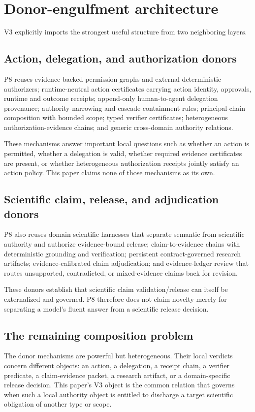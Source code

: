 \section{Donor-engulfment architecture}

V3 explicitly imports the strongest useful structure from two neighboring layers.

\subsection{Action, delegation, and authorization donors}

P8 reuses evidence-backed permission graphs and external deterministic authorizers; runtime-neutral action certificates carrying action identity, approvals, runtime and outcome receipts; append-only human-to-agent delegation provenance; authority-narrowing and cascade-containment rules; principal-chain composition with bounded scope; typed verifier certificates; heterogeneous authorization-evidence chains; and generic cross-domain authority relations.

These mechanisms answer important local questions such as whether an action is permitted, whether a delegation is valid, whether required evidence certificates are present, or whether heterogeneous authorization receipts jointly satisfy an action policy. This paper claims none of those mechanisms as its own.

\subsection{Scientific claim, release, and adjudication donors}

P8 also reuses domain scientific harnesses that separate semantic from scientific authority and authorize evidence-bound release; claim-to-evidence chains with deterministic grounding and verification; persistent contract-governed research artifacts; evidence-calibrated claim adjudication; and evidence-ledger review that routes unsupported, contradicted, or mixed-evidence claims back for revision.

These donors establish that scientific claim validation/release can itself be externalized and governed. P8 therefore does not claim novelty merely for separating a model's fluent answer from a scientific release decision.

\subsection{The remaining composition problem}

The donor mechanisms are powerful but heterogeneous. Their local verdicts concern different objects: an action, a delegation, a receipt chain, a verifier predicate, a claim-evidence packet, a research artifact, or a domain-specific release decision. This paper's V3 object is the common relation that governs when such a local authority object is entitled to discharge a target scientific obligation of another type or scope.
